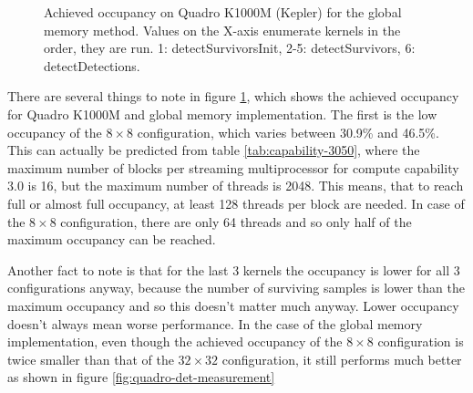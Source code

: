 \begin{figure}[ht]
\centering{}
	\caption{Achieved occupancy on Quadro K1000M (Kepler) for the global memory method. Values on the X-axis enumerate kernels in the order, they are run. 1: detectSurvivorsInit, 2-5: detectSurvivors, 6: detectDetections.}
	\label{fig:occupancy-quadro}
\end{figure}

There are several things to note in figure \ref{fig:occupancy-quadro}, which shows the achieved occupancy for Quadro K1000M and global memory implementation. The first is the low occupancy of the $8 \times 8$ configuration, which varies between 30.9\% and 46.5\%. This can actually be predicted from table \ref{tab:capability-3050}, where the maximum number of blocks per streaming multiprocessor for compute capability 3.0 is 16, but the maximum number of threads is 2048. This means, that to reach full or almost full occupancy, at least 128 threads per block are needed. In case of the $8 \times 8$ configuration, there are only 64 threads and so only half of the maximum occupancy can be reached.

Another fact to note is that for the last 3 kernels the occupancy is lower for all 3 configurations anyway, because the number of surviving samples is lower than the maximum occupancy and so this doesn't matter much anyway. Lower occupancy doesn't always mean worse performance. In the case of the global memory implementation, even though the achieved occupancy of the $8 \times 8$ configuration is twice smaller than that of the $32 \times 32$ configuration, it still performs much better as shown in figure \ref{fig:quadro-det-measurement}

